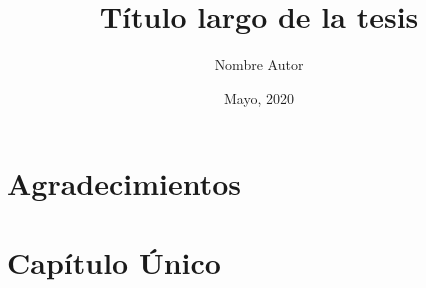 \documentclass[12pt,letterpaper,twoside,openright,oldfontcommands]{memoir}
\title{Título largo de la tesis}
\author{Nombre Autor}
\date{Mayo, 2020}
\begin{document}
    \maketitle
    \frontmatter
    \tableofcontents
    \chapter{Agradecimientos}
    \mainmatter
    \chapter{Capítulo Único}
\end{document}
